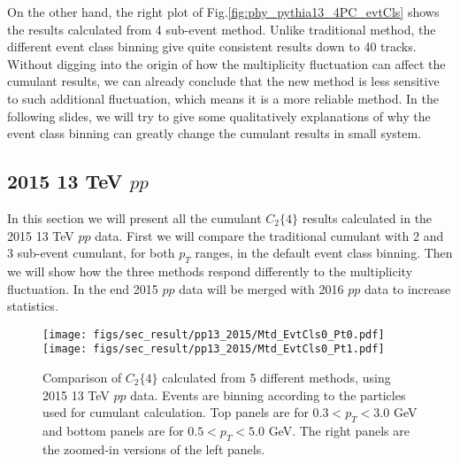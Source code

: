 On the other hand, the right plot of Fig.\ref{fig:phy_pythia13_4PC_evtCls} shows the results calculated from 4 sub-event method. Unlike traditional method, the different event class binning give quite consistent results down to 40 tracks. Without digging into the origin of how the multiplicity fluctuation can affect the cumulant results, we can already conclude that the new method is less sensitive to such additional fluctuation, which means it is a more reliable method. In the following slides, we will try to give some qualitatively explanations of why the event class binning can greatly change the cumulant results in small system.



\subsection{2015 13 TeV $pp$}
In this section we will present all the cumulant $C_{2}\{4\}$ results calculated in the 2015 13 TeV $pp$ data. First we will compare the traditional cumulant with 2 and 3 sub-event cumulant, for both $p_{T}$ ranges, in the default event class binning. Then we will show how the three methods respond differently to the multiplicity fluctuation. In the end 2015 $pp$ data will be merged with 2016 $pp$ data to increase statistics.

\begin{figure}[H]
\centering
\texttt{[image: figs/sec\_result/pp13\_2015/Mtd\_EvtCls0\_Pt0.pdf]}
\texttt{[image: figs/sec\_result/pp13\_2015/Mtd\_EvtCls0\_Pt1.pdf]}
\caption{Comparison of $C_{2}\{4\}$ calculated from 5 different methods, using 2015 13 TeV $pp$ data. Events are binning according to the particles used for cumulant calculation. Top panels are for $0.3<p_{T}<3.0$ GeV and bottom panels are for $0.5<p_{T}<5.0$ GeV. The right panels are the zoomed-in versions of the left panels.}
\label{fig:result_pp13_2015_Mtd_EvtCls0}
\end{figure}

